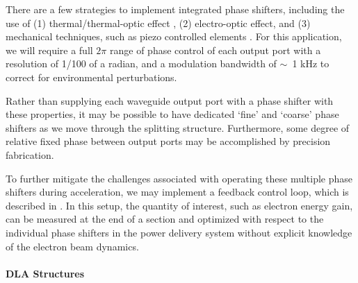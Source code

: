 There are a few strategies to implement integrated phase shifters, including the use of (1) thermal/thermal-optic effect \cite{kwong20111,kwong2014chip}, (2) electro-optic effect, and (3) mechanical techniques, such as piezo controlled elements \cite{poot2014broadband}.
For this application, we will require a full $2\pi$ range of phase control of each output port with a resolution of 1/100 of a radian, and a modulation bandwidth of $\sim$~1 kHz to correct for environmental perturbations.

Rather than supplying each waveguide output port with a phase shifter with these properties, it may be possible to have dedicated `fine' and `coarse' phase shifters as we move through the splitting structure.
Furthermore, some degree of relative fixed phase between output ports may be accomplished by precision fabrication.


To further mitigate the challenges associated with operating these multiple phase shifters during acceleration, we may implement a feedback control loop, which is described in .
In this setup, the quantity of interest, such as electron energy gain, can be measured at the end of a section and optimized with respect to the individual phase shifters in the power delivery system without explicit knowledge of the electron beam dynamics.

\paragraph{DLA Structures}


